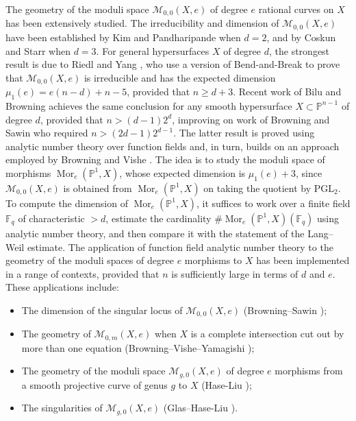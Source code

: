 \documentclass[12pt, reqno]{amsart}
\numberwithin{equation}{section}
\newcommand{\0}{\mathbf{0}}
\newcommand{\PP}{\mathbb{P}}
\newcommand{\FF}{\mathbb{F}}
\renewcommand{\geq}{\geqslant}
\def \Mor {\operatorname{Mor}}
\renewcommand{\=}{\equiv}
\newcommand{\1}{\mathbf{1}}
\theoremstyle{definition}
\begin{document}
The geometry of the moduli space $\mathcal M_{0,0}(X,e)$ of degree $e$ rational curves on $X$
has been  extensively studied. 
The irreducibility and dimension of $\mathcal{M}_{0,0}(X,e)$ have been established by Kim and Pandharipande  \cite[Cor.~1]{kim} when $d=2$, and by  Coskun and Starr \cite{CS} when $d = 3$. For general hypersurfaces $X$ of degree $d$, the strongest result is due to Riedl and Yang \cite{RY}, who use a version of  Bend-and-Break to prove that
$\mathcal M_{0,0}(X,e)$ is irreducible and has the  expected dimension $\mu_1(e)=e(n-d)+n-5$,  provided that $n\geq d+3$.
Recent work of Bilu  and Browning \cite[Cor.~1.4]{bilu}
achieves the same conclusion for any  smooth hypersurface $X\subset \PP^{n-1}$ of degree $d$, provided that
$n> (d-1)2^{d}$, improving on work of  Browning and Sawin \cite[Thm.~1.1]{BS2} who 
required $n> (2d - 1)2^{d-1}$. The latter result is proved using analytic number theory over function fields and, in turn,  builds on an approach
employed by Browning and Vishe \cite{BV'}. The idea is to study
the moduli space of morphisms
$\Mor_e(\PP^1,X)$, whose expected dimension is $\mu_1(e)+3$, since
$\mathcal{M}_{0,0}(X,e)$ is obtained from $\Mor_e(\PP^1,X)$ 
on taking the quotient by $\mathrm{PGL}_2$. 
To compute the dimension of $\Mor_e(\PP^1,X)$, it suffices to work over a finite field $\FF_q$ of  characteristic $>d$, estimate the cardinality
$\#\Mor_e(\PP^1,X)(\FF_q)$ using analytic number theory, and then compare it with the statement of the Lang--Weil estimate. The  application of function field analytic number theory to the geometry 
of the moduli spaces of degree $e$ morphisms to $X$
has  been 
implemented in a range of contexts, provided that $n$ is sufficiently large in terms of $d$ and $e$. These applications include:
 \begin{itemize}
 \item
The dimension of the  singular locus of
 $\mathcal M_{0,0}(X,e)$ (Browning--Sawin \cite{BS2});
 \item
 The geometry of  $\mathcal M_{0,m}(X,e)$ when $X$ is a complete intersection cut out by more than one equation  (Browning--Vishe--Yamagishi \cite{BVY});
\item
The geometry of the moduli space
 $\mathcal M_{g,0}(X,e)$
of degree $e$ morphisms from a smooth
projective curve of genus $g$ to $X$ (Hase-Liu \cite{hase1});
\item
The singularities of $\mathcal M_{g,0}(X,e)$ (Glas--Hase-Liu \cite{hase2}).
 \end{itemize}
\end{document}
